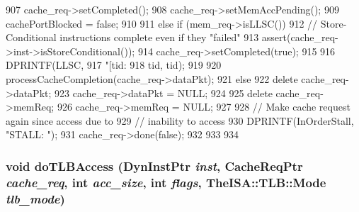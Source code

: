 \begin{DoxyCode}
{{{907             cache_req->setCompleted();
908             cache_req->setMemAccPending();
909             cachePortBlocked = false;
910         }
911     } else if (mem_req->isLLSC()){
912         // Store-Conditional instructions complete even if they "failed"
913         assert(cache_req->inst->isStoreConditional());
914         cache_req->setCompleted(true);
915 
916         DPRINTF(LLSC,
917                 "[tid:%
918                 tid, tid);
919 
920         processCacheCompletion(cache_req->dataPkt);
921     } else {
922         delete cache_req->dataPkt;
923         cache_req->dataPkt = NULL;
924 
925         delete cache_req->memReq;
926         cache_req->memReq = NULL;
927 
928         // Make cache request again since access due to
929         // inability to access
930         DPRINTF(InOrderStall, "STALL: \n");
931         cache_req->done(false);
932     }
933 
934 }
\end{DoxyCode}
\hypertarget{classCacheUnit_a88205381d7b3d93f930cac7bacc96022}{
\subsubsection[{doTLBAccess}]{\setlength{\rightskip}{0pt plus 5cm}void doTLBAccess ({\bf DynInstPtr} {\em inst}, \/  {\bf CacheReqPtr} {\em cache\_\-req}, \/  int {\em acc\_\-size}, \/  int {\em flags}, \/  TheISA::TLB::Mode {\em tlb\_\-mode})}}
\label{classCacheUnit_a88205381d7b3d93f930cac7bacc96022}



